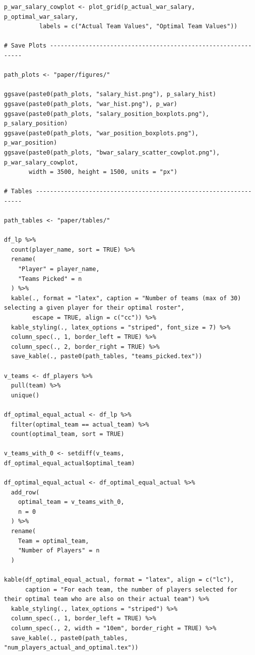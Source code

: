 \documentclass{article}
\begin{document}
\begin{singlespace}
\begin{verbatim}
p_war_salary_cowplot <- plot_grid(p_actual_war_salary, p_optimal_war_salary, 
          labels = c("Actual Team Values", "Optimal Team Values"))

# Save Plots --------------------------------------------------------------

path_plots <- "paper/figures/"

ggsave(paste0(path_plots, "salary_hist.png"), p_salary_hist)
ggsave(paste0(path_plots, "war_hist.png"), p_war)
ggsave(paste0(path_plots, "salary_position_boxplots.png"), p_salary_position)
ggsave(paste0(path_plots, "war_position_boxplots.png"), p_war_position)
ggsave(paste0(path_plots, "bwar_salary_scatter_cowplot.png"), p_war_salary_cowplot, 
       width = 3500, height = 1500, units = "px")

# Tables ------------------------------------------------------------------

path_tables <- "paper/tables/"

df_lp %>% 
  count(player_name, sort = TRUE) %>% 
  rename(
    "Player" = player_name,
    "Teams Picked" = n
  ) %>% 
  kable(., format = "latex", caption = "Number of teams (max of 30) selecting a given player for their optimal roster", 
        escape = TRUE, align = c("cc")) %>% 
  kable_styling(., latex_options = "striped", font_size = 7) %>% 
  column_spec(., 1, border_left = TRUE) %>% 
  column_spec(., 2, border_right = TRUE) %>% 
  save_kable(., paste0(path_tables, "teams_picked.tex"))

v_teams <- df_players %>% 
  pull(team) %>% 
  unique()

df_optimal_equal_actual <- df_lp %>% 
  filter(optimal_team == actual_team) %>% 
  count(optimal_team, sort = TRUE)

v_teams_with_0 <- setdiff(v_teams, df_optimal_equal_actual$optimal_team)

df_optimal_equal_actual <- df_optimal_equal_actual %>% 
  add_row(
    optimal_team = v_teams_with_0,
    n = 0
  ) %>% 
  rename(
    Team = optimal_team,
    "Number of Players" = n
  )
        
kable(df_optimal_equal_actual, format = "latex", align = c("lc"),
      caption = "For each team, the number of players selected for their optimal team who are also on their actual team") %>% 
  kable_styling(., latex_options = "striped") %>% 
  column_spec(., 1, border_left = TRUE) %>% 
  column_spec(., 2, width = "10em", border_right = TRUE) %>% 
  save_kable(., paste0(path_tables, "num_players_actual_and_optimal.tex"))        
  

\end{verbatim}
\end{singlespace}
\end{document}
